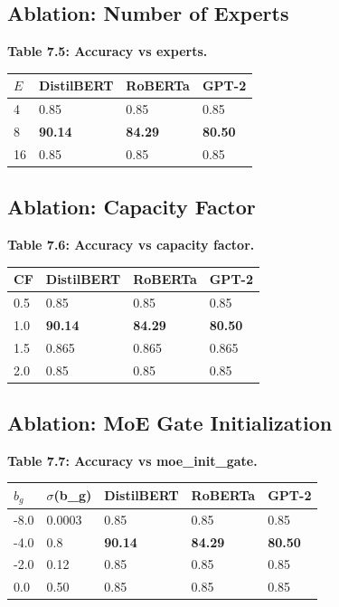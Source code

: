 \subsection{Ablation: Number of Experts}

\textbf{Table 7.5: Accuracy vs experts.}

\begin{table}[H]
\centering
\small
\begin{tabular}{llll}
\toprule
\textbf{$E$} & \textbf{DistilBERT} & \textbf{RoBERTa} & \textbf{GPT-2} \\
\midrule
4 & 0.85 & 0.85 & 0.85 \\
8 & \textbf{90.14} & \textbf{84.29} & \textbf{80.50} \\
16 & 0.85 & 0.85 & 0.85 \\
\bottomrule
\end{tabular}
\end{table}

\subsection{Ablation: Capacity Factor}

\textbf{Table 7.6: Accuracy vs capacity factor.}

\begin{table}[H]
\centering
\small
\begin{tabular}{llll}
\toprule
\textbf{CF} & \textbf{DistilBERT} & \textbf{RoBERTa} & \textbf{GPT-2} \\
\midrule
0.5 & 0.85 & 0.85 & 0.85 \\
1.0 & \textbf{90.14} & \textbf{84.29} & \textbf{80.50} \\
1.5 & 0.865 & 0.865 & 0.865 \\
2.0 & 0.85 & 0.85 & 0.85 \\
\bottomrule
\end{tabular}
\end{table}

\subsection{Ablation: MoE Gate Initialization}

\textbf{Table 7.7: Accuracy vs moe\_init\_gate.}

\begin{table}[H]
\centering
\small
\begin{tabular}{lllll}
\toprule
\textbf{$b_g$} & \textbf{$\sigma$(b\_g)} & \textbf{DistilBERT} & \textbf{RoBERTa} & \textbf{GPT-2} \\
\midrule
-8.0 & 0.0003 & 0.85 & 0.85 & 0.85 \\
-4.0 & 0.8 & \textbf{90.14} & \textbf{84.29} & \textbf{80.50} \\
-2.0 & 0.12 & 0.85 & 0.85 & 0.85 \\
0.0 & 0.50 & 0.85 & 0.85 & 0.85 \\
\bottomrule
\end{tabular}
\end{table}

